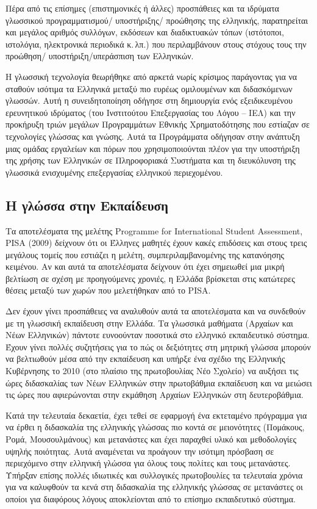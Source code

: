 \documentclass[]{../../metanetpaper}
\begin{document}
\begin{multicols}{2}
Πέρα από τις επίσημες (επιστημονικές ή άλλες) προσπάθειες και τα ιδρύματα γλωσσικού προγραμματισμού/ υποστήριξης/ προώθησης της ελληνικής, παρατηρείται και μεγάλος αριθμός συλλόγων, εκδόσεων και διαδικτυακών τόπων (ιστότοποι, ιστολόγια, ηλεκτρονικά περιοδικά κ.\,λπ.) που περιλαμβάνουν στους στόχους τους την προώθηση/ υποστήριξη/υπεράσπιση των Ελληνικών.

Η γλωσσική τεχνολογία θεωρήθηκε από αρκετά νωρίς κρίσιμος παράγοντας για να σταθούν ισότιμα τα  Ελληνικά μεταξύ πιο ευρέως ομιλουμένων και διδασκόμενων γλωσσών. Αυτή η συνειδητοποίηση οδήγησε στη δημιουργία ενός εξειδικευμένου ερευνητικού ιδρύματος (του Ινστιτούτου Επεξεργασίας του Λόγου – ΙΕΛ) και την προκήρυξη τριών μεγάλων Προγραμμάτων Εθνικής Χρηματοδότησης που εστίαζαν σε τεχνολογίες γλώσσας και γνώσης. Αυτά τα Προγράμματα οδήγησαν στην ανάπτυξη μιας ομάδας εργαλείων και πόρων που χρησιμοποιούνται πλέον για την υποστήριξη της χρήσης των Ελληνικών σε Πληροφοριακά Συστήματα και τη διευκόλυνση της γλωσσικά ενισχυμένης επεξεργασίας ελληνικού περιεχομένου.

\subsection{Η γλώσσα στην Εκπαίδευση}

Τα αποτελέσματα της μελέτης Programme for International Student Assessment, PISA (2009) \cite{Pisa2} δείχνουν ότι οι Έλληνες μαθητές έχουν κακές επιδόσεις και στους τρεις μεγάλους τομείς που εστιάζει η μελέτη, συμπεριλαμβανομένης της κατανόησης κειμένου. Αν και αυτά τα αποτελέσματα δείχνουν ότι έχει σημειωθεί μια μικρή βελτίωση σε σχέση με προηγούμενες χρονιές, η Ελλάδα βρίσκεται στις κατώτερες θέσεις μεταξύ των χωρών που μελετήθηκαν από το PISA.

Δεν έχουν γίνει προσπάθειες  να αναλυθούν αυτά τα αποτελέσματα και να συνδεθούν με τη γλωσσική εκπαίδευση στην Ελλάδα. Τα γλωσσικά μαθήματα (Αρχαίων και Νέων Ελληνικών) πάντοτε ευνοούνταν ποσοτικά στο ελληνικό εκπαιδευτικό σύστημα. Έχουν γίνει πολλές συζητήσεις για το πώς οι δεξιότητες στη μητρική γλώσσα μπορούν να βελτιωθούν μέσα από την εκπαίδευση και υπήρξε ένα σχέδιο της Ελληνικής Κυβέρνησης το 2010 (στο πλαίσιο της πρωτοβουλίας Νέο Σχολείο) να αυξήσει τις ώρες διδασκαλίας των Νέων Ελληνικών στην πρωτοβάθμια εκπαίδευση και να μειώσει τις ώρες που αφιερώνονται στην εκμάθηση Αρχαίων Ελληνικών στη δευτεροβάθμια.

Κατά την τελευταία δεκαετία, έχει τεθεί σε εφαρμογή ένα εκτεταμένο πρόγραμμα για να έρθει η διδασκαλία της ελληνικής γλώσσας πιο κοντά σε μειονότητες (Πομάκους, Ρομά, Μουσουλμάνους) και μετανάστες και έχει παραχθεί υλικό και μεθοδολογίες υψηλής ποιότητας. Αυτά αναμένεται να προάγουν την ισότιμη πρόσβαση σε περιεχόμενο στην ελληνική γλώσσα για όλους τους πολίτες και τους μετανάστες. Υπήρξαν επίσης πολλές ιδιωτικές και συλλογικές πρωτοβουλίες τα τελευταία χρόνια για να καλυφθούν τα κενά στη διδασκαλία της ελληνικής γλώσσας σε μετανάστες οι οποίοι για διαφόρους λόγους αποκλείονται από το επίσημο εκπαιδευτικό σύστημα.


\end{multicols}
\end{document}
